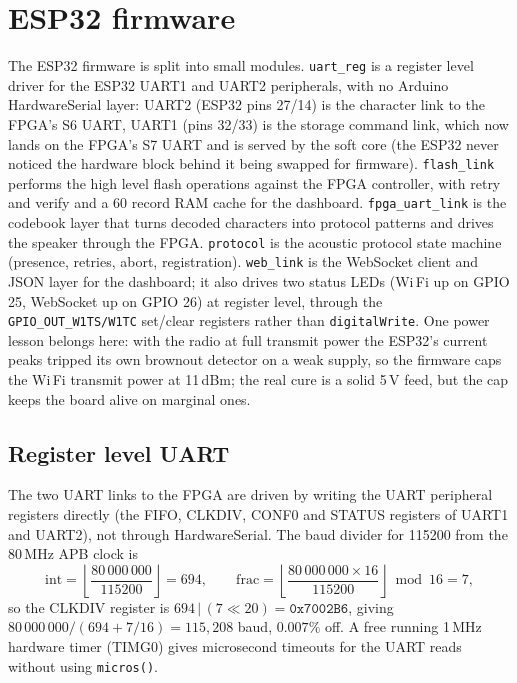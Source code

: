 \documentclass[a4paper,11pt]{article}
\begin{document}
\section{ESP32 firmware}

The ESP32 firmware is split into small modules. \texttt{uart\_reg} is a register
level driver for the ESP32 UART1 and UART2 peripherals, with no Arduino
HardwareSerial layer: UART2 (ESP32 pins 27/14) is the character link to the FPGA's
S6 UART, UART1 (pins 32/33) is the storage command link, which now lands on the
FPGA's S7 UART and is served by the soft core (the ESP32 never noticed the
hardware block behind it being swapped for firmware).
\texttt{flash\_link} performs the high level flash operations
against the FPGA controller, with retry and verify and a 60 record RAM cache for the
dashboard. \texttt{fpga\_uart\_link} is the codebook layer that turns decoded
characters into protocol patterns and drives the speaker through the FPGA.
\texttt{protocol} is the acoustic protocol state machine (presence, retries, abort,
registration). \texttt{web\_link} is the WebSocket client and JSON layer for the
dashboard; it also drives two status LEDs (Wi\,Fi up on GPIO 25, WebSocket up on
GPIO 26) at register level, through the \texttt{GPIO\_OUT\_W1TS/W1TC} set/clear
registers rather than \texttt{digitalWrite}. One power lesson belongs here: with
the radio at full transmit power the ESP32's current peaks tripped its own
brownout detector on a weak supply, so the firmware caps the Wi\,Fi transmit
power at 11\,dBm; the real cure is a solid 5\,V feed, but the cap keeps the board
alive on marginal ones.

\subsection{Register level UART}

The two UART links to the FPGA are driven by writing the UART peripheral registers
directly (the FIFO, CLKDIV, CONF0 and STATUS registers of UART1 and UART2), not
through HardwareSerial. The baud divider for 115200 from the 80\,MHz APB clock is
\[
\mathrm{int} = \left\lfloor \frac{80\,000\,000}{115200}\right\rfloor = 694,\qquad
\mathrm{frac} = \left\lfloor \frac{80\,000\,000\times 16}{115200}\right\rfloor \bmod 16 = 7,
\]
so the CLKDIV register is $694\,|\,(7\ll 20)=\texttt{0x7002B6}$, giving
$80\,000\,000/(694+7/16)=115{,}208$ baud, $0.007\%$ off. A free running 1\,MHz
hardware timer (TIMG0) gives microsecond timeouts for the UART reads without using
\texttt{micros()}.
\end{document}
